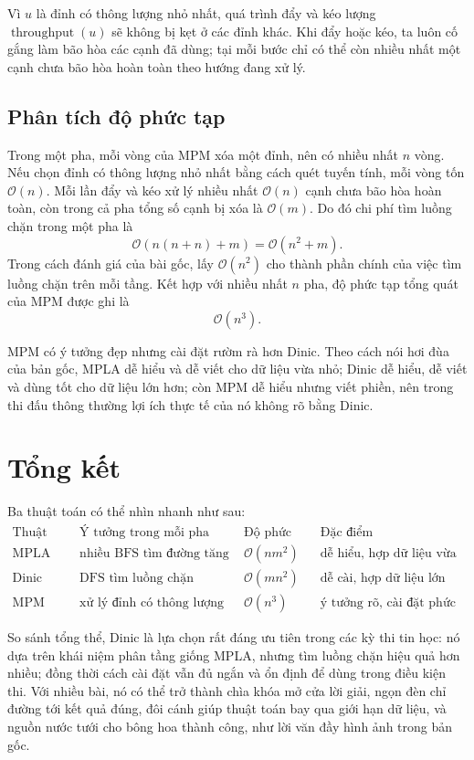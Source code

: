 \documentclass[11pt]{article}
\newcommand{\Oh}{\mathcal{O}}
\newcommand{\throughput}{\operatorname{throughput}}
\begin{document}
Vì \(u\) là đỉnh có thông lượng nhỏ nhất, quá trình đẩy và kéo lượng
\(\throughput(u)\) sẽ không bị kẹt ở các đỉnh khác. Khi đẩy hoặc kéo, ta luôn
cố gắng làm bão hòa các cạnh đã dùng; tại mỗi bước chỉ có thể còn nhiều nhất
một cạnh chưa bão hòa hoàn toàn theo hướng đang xử lý.

\subsection{Phân tích độ phức tạp}

Trong một pha, mỗi vòng của MPM xóa một đỉnh, nên có nhiều nhất \(n\) vòng.
Nếu chọn đỉnh có thông lượng nhỏ nhất bằng cách quét tuyến tính, mỗi vòng tốn
\(\Oh(n)\). Mỗi lần đẩy và kéo xử lý nhiều nhất \(\Oh(n)\) cạnh chưa bão hòa
hoàn toàn, còn trong cả pha tổng số cạnh bị xóa là \(\Oh(m)\). Do đó chi phí
tìm luồng chặn trong một pha là
\[
  \Oh(n(n+n)+m)=\Oh(n^2+m).
\]
Trong cách đánh giá của bài gốc, lấy \(\Oh(n^2)\) cho thành phần chính của
việc tìm luồng chặn trên mỗi tầng. Kết hợp với nhiều nhất \(n\) pha, độ phức
tạp tổng quát của MPM được ghi là
\[
  \Oh(n^3).
\]

MPM có ý tưởng đẹp nhưng cài đặt rườm rà hơn Dinic. Theo cách nói hơi đùa của
bản gốc, MPLA dễ hiểu và dễ viết cho dữ liệu vừa nhỏ; Dinic dễ hiểu, dễ viết
và dùng tốt cho dữ liệu lớn hơn; còn MPM dễ hiểu nhưng viết phiền, nên trong
thi đấu thông thường lợi ích thực tế của nó không rõ bằng Dinic.

\section{Tổng kết}

Ba thuật toán có thể nhìn nhanh như sau:
\[
\begin{array}{c|c|c|c}
\text{Thuật toán} & \text{Ý tưởng trong mỗi pha} &
\text{Độ phức tạp} & \text{Đặc điểm}\\
\hline
\text{MPLA} & \text{nhiều BFS tìm đường tăng} &
\Oh(nm^2) & \text{dễ hiểu, hợp dữ liệu vừa và nhỏ}\\
\text{Dinic} & \text{DFS tìm luồng chặn} &
\Oh(mn^2) & \text{dễ cài, hợp dữ liệu lớn hơn}\\
\text{MPM} & \text{xử lý đỉnh có thông lượng nhỏ nhất} &
\Oh(n^3) & \text{ý tưởng rõ, cài đặt phức tạp hơn}
\end{array}
\]

So sánh tổng thể, Dinic là lựa chọn rất đáng ưu tiên trong các kỳ thi tin học:
nó dựa trên khái niệm phân tầng giống MPLA, nhưng tìm luồng chặn hiệu quả hơn
nhiều; đồng thời cách cài đặt vẫn đủ ngắn và ổn định để dùng trong điều kiện
thi. Với nhiều bài, nó có thể trở thành chìa khóa mở cửa lời giải, ngọn đèn
chỉ đường tới kết quả đúng, đôi cánh giúp thuật toán bay qua giới hạn dữ liệu,
và nguồn nước tưới cho bông hoa thành công, như lời văn đầy hình ảnh trong bản
gốc.
\end{document}
